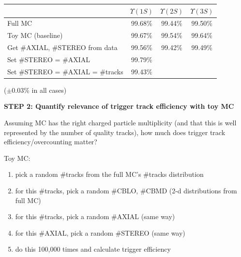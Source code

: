 \documentclass[landscape]{article}
\begin{document}
\vfill

\begin{center}
  \renewcommand{\arraystretch}{1.25}
  \begin{tabular}{p{12 cm} c c c}
  & \mbox{\hspace{0.5 cm}} $\Upsilon(1S)$ \mbox{\hspace{0.5 cm}} & \mbox{\hspace{0.5 cm}} $\Upsilon(2S)$ \mbox{\hspace{0.5 cm}} & \mbox{\hspace{0.5 cm}} $\Upsilon(3S)$ \mbox{\hspace{0.5 cm}} \\\hline
  Full MC & 99.68\% & 99.44\% & 99.50\% \\
  Toy MC (baseline) & 99.67\% & 99.54\% & 99.64\% \\
  Get \#AXIAL, \#STEREO from data & 99.56\% & 99.42\% & 99.49\% \\
  Set \#STEREO = \#AXIAL & 99.79\% & & \\
  Set \#STEREO = \#AXIAL = \#tracks & 99.43\% & & \\
  \end{tabular}
\end{center}
\begin{flushright} ($\pm$0.03\% in all cases) \end{flushright}

\vfill

\pagebreak

\vspace{1 cm}

{\bf STEP 2: Quantify relevance of trigger track efficiency with toy MC}

\vfill

Assuming MC has the right charged particle multiplicity (and that this
is well represented by the number of quality tracks), how much does
trigger track efficiency/overcounting matter?

\vfill

Toy MC:
\begin{enumerate}

  \item pick a random \#tracks from the full MC's \#tracks distribution

  \item for this \#tracks, pick a random \#CBLO, \#CBMD (2-d distributions from full MC)

  \item for this \#tracks, pick a random \#AXIAL (same way)

  \item for this \#AXIAL, pick a random \#STEREO (same way)

  \item do this 100,000 times and calculate trigger efficiency

\end{enumerate}
\end{document}
